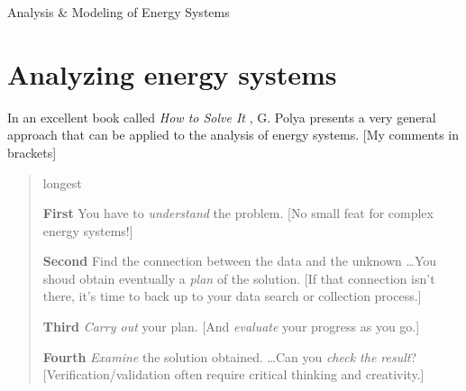 \documentclass[10pt]{article}
\begin{document}
   \noindent
   \begin{center}

   \hrulefill
   
   \vspace{5pt}
   
   \vspace{0pt}
   
   {\Large \hfill Analysis \& Modeling of Energy Systems \hfill}
   \vspace{5pt}
   
  
   \hrulefill
   \end{center}

{}

\section{Analyzing energy systems}
In an excellent book called \textit{How to Solve It} \cite{polya}, G. Polya presents a very general approach that can be applied to the analysis of energy systems. [My comments in brackets]

\begin{quote}
\begin{labeling}{longest}
\item [\textbf{First}] You have to \textit{understand} the problem. \cite{polya} [No small feat for complex energy systems!]
\item [\textbf{Second}] Find the connection between the data and the unknown \ldots You shoud obtain eventually a \textit{plan} of the solution. \cite{polya} [If that connection isn't there, it's time to back up to your data search or collection process.]
\item [\textbf{Third}] \textit{Carry out} your plan. \cite{polya} [And \textit{evaluate} your progress as you go.]
\item [\textbf{Fourth}] \textit{Examine} the solution obtained. \ldots Can you \textit{check the result}?  \cite{polya} [Verification/validation often require critical thinking and creativity.]

\end{labeling}
\end{quote}
\end{document}
